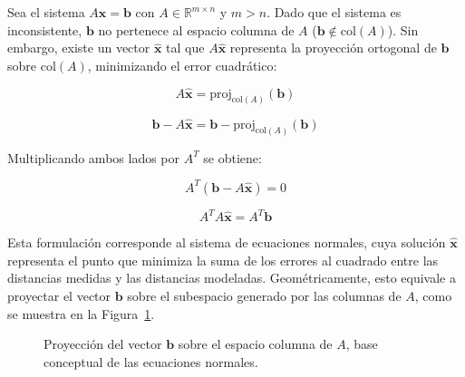 Sea el sistema $A\mathbf{x} = \mathbf{b}$ con $A \in \mathbb{R}^{m \times n}$ y $m > n$. Dado que el sistema es inconsistente, $\mathbf{b}$ no pertenece al espacio columna de $A$ ($\mathbf{b} \notin \text{col}(A)$). Sin embargo, existe un vector $\hat{\mathbf{x}}$ tal que $A\hat{\mathbf{x}}$ representa la proyección ortogonal de $\mathbf{b}$ sobre $\text{col}(A)$, minimizando el error cuadrático:

\[
A\hat{\mathbf{x}} = \text{proj}_{\text{col}(A)}(\mathbf{b})
\]

\[
\mathbf{b} - A\hat{\mathbf{x}} = \mathbf{b} - \text{proj}_{\text{col}(A)}(\mathbf{b})
\]

Multiplicando ambos lados por $A^T$ se obtiene:

\[
A^T(\mathbf{b} - A\hat{\mathbf{x}}) = 0
\]

\[
A^TA\hat{\mathbf{x}} = A^T\mathbf{b}
\]

Esta formulación corresponde al sistema de ecuaciones normales, cuya solución $\hat{\mathbf{x}}$ representa el punto que minimiza la suma de los errores al cuadrado entre las distancias medidas y las distancias modeladas. Geométricamente, esto equivale a proyectar el vector $\mathbf{b}$ sobre el subespacio generado por las columnas de $A$, como se muestra en la Figura~\ref{fig:projection}.

\begin{figure}[htbp]
\centering
    \caption{Proyección del vector $\mathbf{b}$ sobre el espacio columna de $A$, base conceptual de las ecuaciones normales.}
    \label{fig:projection}
\end{figure}

